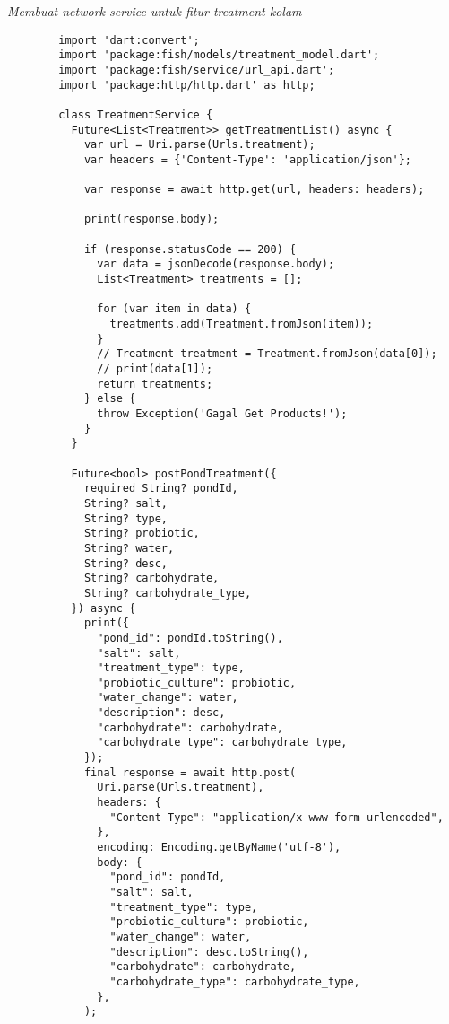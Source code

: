 	\textit{Membuat network service untuk fitur treatment kolam}
	\begin{lstlisting}
        import 'dart:convert';
        import 'package:fish/models/treatment_model.dart';
        import 'package:fish/service/url_api.dart';
        import 'package:http/http.dart' as http;
        
        class TreatmentService {
          Future<List<Treatment>> getTreatmentList() async {
            var url = Uri.parse(Urls.treatment);
            var headers = {'Content-Type': 'application/json'};
        
            var response = await http.get(url, headers: headers);
        
            print(response.body);
        
            if (response.statusCode == 200) {
              var data = jsonDecode(response.body);
              List<Treatment> treatments = [];
        
              for (var item in data) {
                treatments.add(Treatment.fromJson(item));
              }
              // Treatment treatment = Treatment.fromJson(data[0]);
              // print(data[1]);
              return treatments;
            } else {
              throw Exception('Gagal Get Products!');
            }
          }
        
          Future<bool> postPondTreatment({
            required String? pondId,
            String? salt,
            String? type,
            String? probiotic,
            String? water,
            String? desc,
            String? carbohydrate,
            String? carbohydrate_type,
          }) async {
            print({
              "pond_id": pondId.toString(),
              "salt": salt,
              "treatment_type": type,
              "probiotic_culture": probiotic,
              "water_change": water,
              "description": desc,
              "carbohydrate": carbohydrate,
              "carbohydrate_type": carbohydrate_type,
            });
            final response = await http.post(
              Uri.parse(Urls.treatment),
              headers: {
                "Content-Type": "application/x-www-form-urlencoded",
              },
              encoding: Encoding.getByName('utf-8'),
              body: {
                "pond_id": pondId,
                "salt": salt,
                "treatment_type": type,
                "probiotic_culture": probiotic,
                "water_change": water,
                "description": desc.toString(),
                "carbohydrate": carbohydrate,
                "carbohydrate_type": carbohydrate_type,
              },
            );
        

\end{lstlisting}
